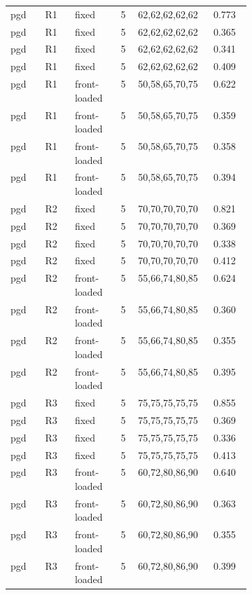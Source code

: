 \begin{table}[t]
\begin{tabular}{llp{0.18\linewidth}cp{0.22\linewidth}c}
pgd & R1 & fixed & 5 & 62,62,62,62,62 & 0.773 \\
pgd & R1 & fixed & 5 & 62,62,62,62,62 & 0.365 \\
pgd & R1 & fixed & 5 & 62,62,62,62,62 & 0.341 \\
pgd & R1 & fixed & 5 & 62,62,62,62,62 & 0.409 \\
pgd & R1 & front-loaded & 5 & 50,58,65,70,75 & 0.622 \\
pgd & R1 & front-loaded & 5 & 50,58,65,70,75 & 0.359 \\
pgd & R1 & front-loaded & 5 & 50,58,65,70,75 & 0.358 \\
pgd & R1 & front-loaded & 5 & 50,58,65,70,75 & 0.394 \\
pgd & R2 & fixed & 5 & 70,70,70,70,70 & 0.821 \\
pgd & R2 & fixed & 5 & 70,70,70,70,70 & 0.369 \\
pgd & R2 & fixed & 5 & 70,70,70,70,70 & 0.338 \\
pgd & R2 & fixed & 5 & 70,70,70,70,70 & 0.412 \\
pgd & R2 & front-loaded & 5 & 55,66,74,80,85 & 0.624 \\
pgd & R2 & front-loaded & 5 & 55,66,74,80,85 & 0.360 \\
pgd & R2 & front-loaded & 5 & 55,66,74,80,85 & 0.355 \\
pgd & R2 & front-loaded & 5 & 55,66,74,80,85 & 0.395 \\
pgd & R3 & fixed & 5 & 75,75,75,75,75 & 0.855 \\
pgd & R3 & fixed & 5 & 75,75,75,75,75 & 0.369 \\
pgd & R3 & fixed & 5 & 75,75,75,75,75 & 0.336 \\
pgd & R3 & fixed & 5 & 75,75,75,75,75 & 0.413 \\
pgd & R3 & front-loaded & 5 & 60,72,80,86,90 & 0.640 \\
pgd & R3 & front-loaded & 5 & 60,72,80,86,90 & 0.363 \\
pgd & R3 & front-loaded & 5 & 60,72,80,86,90 & 0.355 \\
pgd & R3 & front-loaded & 5 & 60,72,80,86,90 & 0.399 \\
\hline
\end{tabular}
\end{table}

